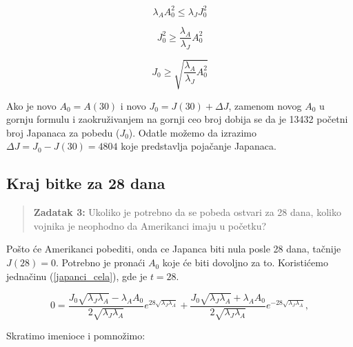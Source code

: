 \documentclass{article}
\newcommand{\laj}{\sqrt{\lambda_J\lambda_A}}
\begin{document}
\[
  \lambda_{A}A_0^2 \leq \lambda_{J}J_0^2
\]

\[
  J_0^2 \geq \frac{\lambda_A}{\lambda_J} A_0^2
\]

\[
  J_0 \geq \sqrt{\frac{\lambda_A}{\lambda_J} A_0^2}
\]

Ako je novo \(A_0 = A(30)\) i novo \(J_0 = J(30) + \Delta J\), zamenom novog \(A_0\) u gornju formulu i zaokruživanjem na gornji ceo broj dobija se da je 13432 početni
broj Japanaca za pobedu (\(J_0\)).
Odatle možemo da izrazimo \(\Delta J = J_0 - J(30) = 4804\) koje predstavlja
pojačanje Japanaca.

\begin{center}
\end{center}

\newpage

\subsection{Kraj bitke za 28 dana}

\vspace{2mm}
\begin{quote}
\textbf{Zadatak 3:}
 Ukoliko je potrebno da se pobeda ostvari za 28 dana, koliko vojnika je
  neophodno da Amerikanci imaju u početku?
\end{quote}

\hspace{5mm}
Pošto će Amerikanci pobediti, onda ce Japanca biti nula posle 28 dana,
tačnije \(J(28) = 0\). Potrebno je pronaći \(A_0\) koje će biti dovoljno
za to. Koristićemo jednačinu (\ref{japanci_cela}), gde je \(t = 28\).

\[
0 = \frac{J_0 \laj - \lambda_A A_0}{2\laj} e^{28 \laj } +
    \frac{J_0 \laj + \lambda_A A_0}{2 \laj } e^{-28 \laj },
\]

Skratimo imenioce i pomnožimo:
\end{document}
